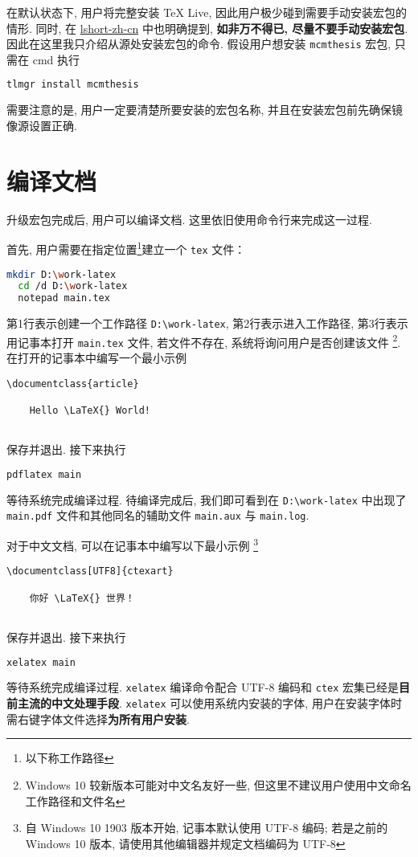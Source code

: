 在默认状态下, 用户将完整安装 \TeX{} Live, 因此用户极少碰到需要手动安装宏包的情形. 
同时, 在
\href{http://mirrors.ctan.org/info/lshort/chinese/lshort-zh-cn.pdf}{lshort-zh-cn}
中也明确提到, \textbf{如非万不得已, 尽量不要手动安装宏包}. 
因此在这里我只介绍从源处安装宏包的命令. 
假设用户想安装 \texttt{mcmthesis} 宏包, 只需在 \textsf{cmd} 执行
\begin{lstlisting}[language=bash]
  tlmgr install mcmthesis
\end{lstlisting}
需要注意的是, 用户一定要清楚所要安装的宏包名称, 并且在安装宏包前先确保镜像源设置正确. 

\section{编译文档}\label{sec:windows:compile}

升级宏包完成后, 用户可以编译文档. 
这里依旧使用命令行来完成这一过程. 

首先, 用户需要在指定位置\footnote{以下称工作路径}建立一个 \texttt{tex} 文件：
\begin{lstlisting}[language = bash]
  mkdir D:\work-latex
  cd /d D:\work-latex
  notepad main.tex
\end{lstlisting}
第1行表示创建一个工作路径 \texttt{D:\textbackslash work-latex},
第2行表示进入工作路径, 第3行表示用记事本打开 \texttt{main.tex} 文件,
若文件不存在, 系统将询问用户是否创建该文件%
\footnote{Windows 10 较新版本可能对中文名友好一些,
但这里不建议用户使用中文命名工作路径和文件名}.
在打开的记事本中编写一个最小示例
\begin{lstlisting}[language={[LaTeX]TeX}]
  \documentclass{article}
  
    Hello \LaTeX{} World!
  
\end{lstlisting}
保存并退出. 
接下来执行
\begin{lstlisting}[language=bash]
  pdflatex main
\end{lstlisting}
等待系统完成编译过程. 
待编译完成后, 我们即可看到在 \texttt{D:\textbackslash work-latex}
中出现了 \texttt{main.pdf} 文件和其他同名的辅助文件
\texttt{main.aux} 与 \texttt{main.log}. 

对于中文文档, 可以在记事本中编写以下最小示例%
\footnote{自 Windows 10 1903 版本开始, 记事本默认使用 UTF-8 编码;
若是之前的 Windows 10 版本, 请使用其他编辑器并规定文档编码为 UTF-8}%
\begin{lstlisting}[language={[LaTeX]TeX}]
  \documentclass[UTF8]{ctexart}
  
    你好 \LaTeX{} 世界！
  
\end{lstlisting}
保存并退出.
接下来执行
\begin{lstlisting}[language=bash]
  xelatex main
\end{lstlisting}
等待系统完成编译过程.
\texttt{xelatex} 编译命令配合 UTF-8 编码和 \texttt{ctex}
宏集已经是\textbf{目前主流的中文处理手段}.
\texttt{xelatex} 可以使用系统内安装的字体,
用户在安装字体时需右键字体文件选择\textbf{为所有用户安装}.

